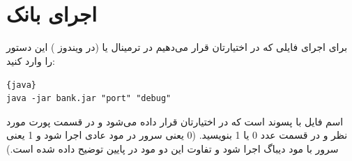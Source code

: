 \documentclass[]{article}
\begin{document}
\newpage
\pagestyle{fancy}
\fancyhf{}
\fancyfoot{}
\cfoot{\thepage}
\renewcommand{\headrulewidth}{2pt}

\KashidaOff



\tableofcontents

\newpage

 \Large \textbf{\\\\
}


\section*{{\titr اجرای بانک}}

برای اجرای فایلی که در اختیارتان قرار می‌دهیم در ترمینال یا (‌در ویندوز ) این دستور را وارد کنید:

\begin{latin}

\begin{lstlisting}{java}
java -jar bank.jar "port" "debug"
\end{lstlisting}

\end{latin}

 اسم فایل با پسوند  است که در اختیارتان قرار داده می‌شود و در قسمت  پورت مورد نظر و در قسمت  عدد 0 یا 1 بنویسید. (0  یعنی سرور در مود عادی اجرا شود و 1 یعنی سرور با مود دیباگ اجرا شود و تفاوت این دو مود در پایین توضیح داده شده است.)
\end{document}
